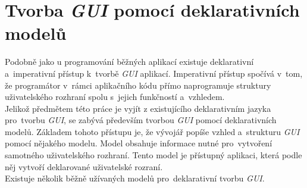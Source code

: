 \documentclass[11pt,twoside,a4paper]{book}
\begin{document}
\section[Deklarativní modely pro tvorbu \textit{GUI}]{\label{SEC:modelGUI}Tvorba \textit{GUI} pomocí deklarativních modelů}
Podobně jako u programování běžných aplikací existuje deklarativní a~imperativní přístup k~tvorbě \textit{GUI} aplikací. Imperativní přístup spočívá v~tom, že programátor v~rámci aplikačního kódu přímo naprogramuje struktury uživatelského rozhraní spolu s~jejich funkčností a~vzhledem.\\
Jelikož předmětem této práce je vyjít z existujícího deklarativním jazyka pro~tvorbu \textit{GUI}, se zabývá především tvorbou \textit{GUI} pomocí deklarativních modelů. Základem tohoto přístupu je, že vývojář popíše vzhled a~strukturu \textit{GUI} pomocí nějakého modelu. Model obsahuje informace nutné pro~vytvoření samotného uživatelského rozhraní. Tento model je přístupný aplikaci, která podle něj vytvoří deklarované uživatelské rozraní\cite{bib:model0}.\\
Existuje několik běžně užívaných modelů pro~deklarativní tvorbu \textit{GUI}.
\end{document}
